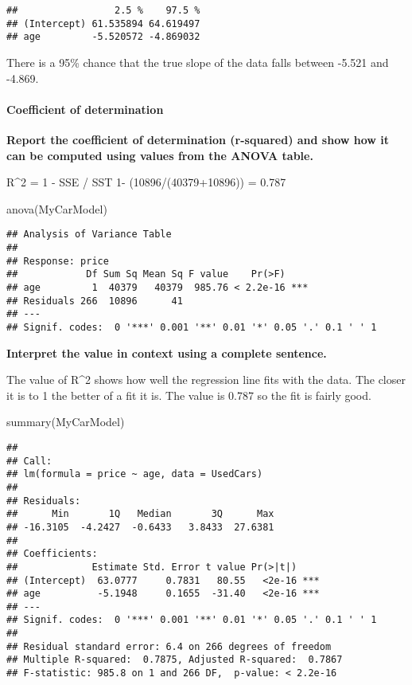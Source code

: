 \documentclass[
]{article}
\newenvironment{Shaded}{\begin{snugshade}}{\end{snugshade}}
\newcommand{\FunctionTok}[1]{\textcolor[rgb]{0.00,0.00,0.00}{#1}}
\newcommand{\NormalTok}[1]{#1}
\begin{document}
\begin{verbatim}
##                 2.5 %    97.5 %
## (Intercept) 61.535894 64.619497
## age         -5.520572 -4.869032
\end{verbatim}

There is a 95\% chance that the true slope of the data falls between
-5.521 and -4.869.

\hypertarget{coefficient-of-determination}{%
\paragraph{Coefficient of
determination}\label{coefficient-of-determination}}

\textbf{Report the coefficient of determination (r-squared) and show how
it can be computed using values from the ANOVA table.}

R\^{}2 = 1 - SSE / SST 1- (10896/(40379+10896)) = 0.787

\begin{Shaded}
\begin{Highlighting}[]
\FunctionTok{anova}\NormalTok{(MyCarModel)}
\end{Highlighting}
\end{Shaded}

\begin{verbatim}
## Analysis of Variance Table
## 
## Response: price
##            Df Sum Sq Mean Sq F value    Pr(>F)    
## age         1  40379   40379  985.76 < 2.2e-16 ***
## Residuals 266  10896      41                      
## ---
## Signif. codes:  0 '***' 0.001 '**' 0.01 '*' 0.05 '.' 0.1 ' ' 1
\end{verbatim}

\textbf{Interpret the value in context using a complete sentence.}

The value of R\^{}2 shows how well the regression line fits with the
data. The closer it is to 1 the better of a fit it is. The value is
0.787 so the fit is fairly good.

\begin{Shaded}
\begin{Highlighting}[]
\FunctionTok{summary}\NormalTok{(MyCarModel)}
\end{Highlighting}
\end{Shaded}

\begin{verbatim}
## 
## Call:
## lm(formula = price ~ age, data = UsedCars)
## 
## Residuals:
##      Min       1Q   Median       3Q      Max 
## -16.3105  -4.2427  -0.6433   3.8433  27.6381 
## 
## Coefficients:
##             Estimate Std. Error t value Pr(>|t|)    
## (Intercept)  63.0777     0.7831   80.55   <2e-16 ***
## age          -5.1948     0.1655  -31.40   <2e-16 ***
## ---
## Signif. codes:  0 '***' 0.001 '**' 0.01 '*' 0.05 '.' 0.1 ' ' 1
## 
## Residual standard error: 6.4 on 266 degrees of freedom
## Multiple R-squared:  0.7875, Adjusted R-squared:  0.7867 
## F-statistic: 985.8 on 1 and 266 DF,  p-value: < 2.2e-16
\end{verbatim}
\end{document}
